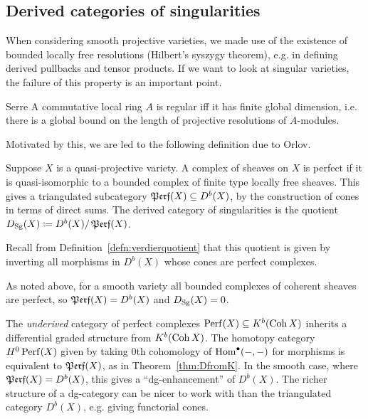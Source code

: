 
\subsection{Derived categories of singularities}

When considering smooth projective varieties, we made use of the existence of
bounded locally free resolutions (Hilbert's syszygy theorem), e.g. in defining
derived pullbacks and tensor products. If we want to look at singular varieties,
the failure of this property is an important point.

\begin{theorem}{Serre}{}
    A commutative local ring $A$ is regular iff it has finite global dimension,
    i.e. there is a global bound on the length of projective resolutions of
    $A$-modules.
\end{theorem}

Motivated by this, we are led to the following definition due to Orlov.

\begin{definition}{}{}
    Suppose $X$ is a quasi-projective variety. A complex of sheaves on $X$ is
    perfect if it is quasi-isomorphic to a bounded complex of finite type
    locally free sheaves. This gives a triangulated subcategory
    $\operatorname{\mathfrak{Perf}}(X)\subseteq D^b(X)$, by the construction of cones in terms of direct
    sums. The derived category of singularities is the quotient
    $D_{\mathrm{Sg}}(X)\coloneqq D^b(X)/\operatorname{\mathfrak{Perf}}(X)$.
\end{definition}

Recall from Definition~\ref{defn:verdierquotient} that this quotient is given by
inverting all morphisms in $D^b(X)$ whose cones are perfect complexes.

\begin{remark}{}{}
    As noted above, for a smooth variety all bounded complexes of coherent
    sheaves are perfect, so $\operatorname{\mathfrak{Perf}}(X)=D^b(X)$ and $D_{\mathrm{Sg}}(X)=0$.
\end{remark}

\begin{remark}{}{}
    The \emph{underived} category of perfect complexes
    $\operatorname{Perf}(X)\subseteq K^b(\operatorname{Coh} X)$ inherits a differential graded structure
    from $K^b(\operatorname{Coh} X)$. The homotopy category $H^0\operatorname{Perf}(X)$ given by taking 0th
    cohomology of $\operatorname{Hom}^\bullet(-,-)$ for morphisms is equivalent to
    $\operatorname{\mathfrak{Perf}}(X)$, as in Theorem~\ref{thm:DfromK}. In the smooth case, where
    $\operatorname{\mathfrak{Perf}}(X)=D^b(X)$, this gives a ``dg-enhancement'' of $D^b(X)$. The richer
    structure of a dg-category can be nicer to work with than the triangulated
    category $D^b(X)$, e.g. giving functorial cones.
\end{remark}

